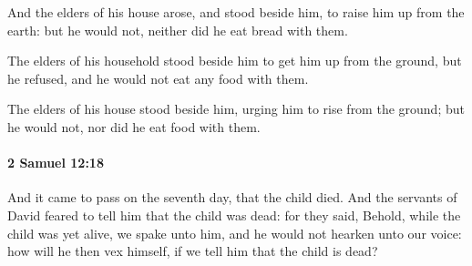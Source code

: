 			\begin{versebox}
					\item[BHS] 
					\item[ASV] And the elders of his house arose, and stood beside him, to raise him up from the earth: but he would not, neither did he eat bread with them.
					\item[NIV] The elders of his household stood beside him to get him up from the ground, but he refused, and he would not eat any food with them.
					\item[NRSV] The elders of his house stood beside him, urging him to rise from the ground; but he would not, nor did he eat food with them.
			\end{versebox}

		\paragraph{2 Samuel 12:18} %
			\label{2SAMUEL-12-18}

			And it came to pass on the seventh day, that the child died. And the servants of David feared to tell him that the child was dead: for they said, Behold, while the child was yet alive, we spake unto him, and he would not hearken unto our voice: how will he then vex himself, if we tell him that the child is dead?

